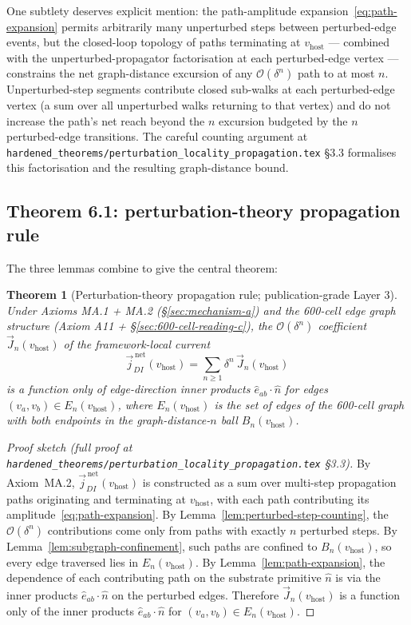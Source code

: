 \documentclass[11pt,letterpaper]{article}
\newtheorem{theorem}{Theorem}[section]
\newcommand{\vhost}{v_{\text{host}}}
\newcommand{\jDInet}{\vec{j}_{DI}^{\,\text{net}}}
\newcommand{\bigO}[1]{\mathcal{O}(#1)}
\begin{document}
One subtlety deserves explicit mention: the path-amplitude expansion~\eqref{eq:path-expansion} permits arbitrarily many unperturbed steps between perturbed-edge events, but the closed-loop topology of paths terminating at $\vhost$ --- combined with the unperturbed-propagator factorisation at each perturbed-edge vertex --- constrains the net graph-distance excursion of any $\bigO{\delta^n}$ path to at most $n$. Unperturbed-step segments contribute closed sub-walks at each perturbed-edge vertex (a sum over all unperturbed walks returning to that vertex) and do not increase the path's net reach beyond the $n$ excursion budgeted by the $n$ perturbed-edge transitions. The careful counting argument at \texttt{hardened\_theorems/perturbation\_locality\_propagation.tex} \S3.3 formalises this factorisation and the resulting graph-distance bound.

\subsection{Theorem 6.1: perturbation-theory propagation rule}
\label{sec:propagation-rule-theorem}

The three lemmas combine to give the central theorem:

\begin{theorem}[Perturbation-theory propagation rule; publication-grade Layer 3]
\label{thm:perturbation-locality}
Under Axioms MA.1 + MA.2 (\S\ref{sec:mechanism-a}) and the 600-cell edge graph structure (Axiom A11 + \S\ref{sec:600-cell-reading-c}), the $\bigO{\delta^n}$ coefficient $\vec{J}_n(\vhost)$ of the framework-local current
\[
\jDInet(\vhost) = \sum_{n \ge 1} \delta^n \, \vec{J}_n(\vhost)
\]
is a function only of edge-direction inner products $\hat{e}_{ab} \cdot \hat{n}$ for edges $(v_a, v_b) \in E_n(\vhost)$, where $E_n(\vhost)$ is the set of edges of the 600-cell graph with both endpoints in the graph-distance-$n$ ball $B_n(\vhost)$.
\end{theorem}

\begin{proof}[Proof sketch (full proof at \texttt{hardened\_theorems/perturbation\_locality\_propagation.tex} \S3.3)]
By Axiom~MA.2, $\jDInet(\vhost)$ is constructed as a sum over multi-step propagation paths originating and terminating at $\vhost$, with each path contributing its amplitude~\eqref{eq:path-expansion}. By Lemma~\ref{lem:perturbed-step-counting}, the $\bigO{\delta^n}$ contributions come only from paths with exactly $n$ perturbed steps. By Lemma~\ref{lem:subgraph-confinement}, such paths are confined to $B_n(\vhost)$, so every edge traversed lies in $E_n(\vhost)$. By Lemma~\ref{lem:path-expansion}, the dependence of each contributing path on the substrate primitive $\hat{n}$ is via the inner products $\hat{e}_{ab} \cdot \hat{n}$ on the perturbed edges. Therefore $\vec{J}_n(\vhost)$ is a function only of the inner products $\hat{e}_{ab} \cdot \hat{n}$ for $(v_a, v_b) \in E_n(\vhost)$.
\end{proof}
\end{document}
